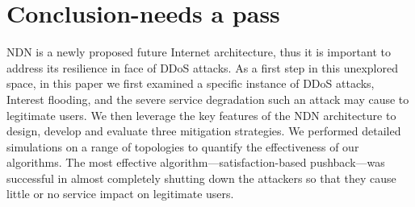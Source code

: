 \section{Conclusion{\color{red}-needs a pass}}
\label{sec:conclusion}


%
%

NDN is a newly proposed future Internet architecture, thus it is important to address its resilience in face of DDoS attacks. As a first step in this unexplored space, in this paper we first examined a specific instance of DDoS attacks, Interest flooding, and the severe service degradation such an attack may cause to legitimate users. We then leverage the key features of the NDN architecture to design, develop and evaluate three mitigation strategies.
We performed detailed simulations on a range of topologies to quantify the effectiveness of our algorithms.   
The most effective algorithm---satisfaction-based pushback---was successful in almost completely shutting down the attackers so that they cause little or no service impact on legitimate users.

